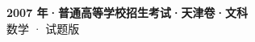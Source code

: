 \documentclass[zihao=-4, a4paper]{ctexart}
\begin{document}
\begin{center}
  {\Large\bfseries 2007 年·普通高等学校招生考试·天津卷·文科}\\[4pt]
  {\large 数学 · 试题版}
\end{center}
\medskip
{}

\end{document}
